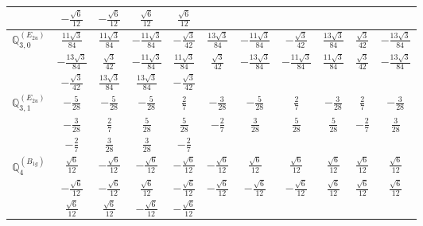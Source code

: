 \documentclass[fleqn,10pt,landscape]{article}
\begin{document}
\begin{itemize}
{\begin{center}
\begin{longtable}{ccccccccccc}
& $ - \frac{\sqrt{6}}{12} $ & $ - \frac{\sqrt{6}}{12} $ & $ \frac{\sqrt{6}}{12} $ & $ \frac{\sqrt{6}}{12} $ & $  $ & $  $ & $  $ & $  $ & $  $ & $  $ \\ \hline
$\mathbb{Q}_{3,0}^{(E_{2u})}$ & $ \frac{11 \sqrt{3}}{84} $ & $ \frac{11 \sqrt{3}}{84} $ & $ - \frac{11 \sqrt{3}}{84} $ & $ - \frac{\sqrt{3}}{42} $ & $ \frac{13 \sqrt{3}}{84} $ & $ - \frac{11 \sqrt{3}}{84} $ & $ - \frac{\sqrt{3}}{42} $ & $ \frac{13 \sqrt{3}}{84} $ & $ \frac{\sqrt{3}}{42} $ & $ - \frac{13 \sqrt{3}}{84} $ \\
& $ - \frac{13 \sqrt{3}}{84} $ & $ \frac{\sqrt{3}}{42} $ & $ - \frac{11 \sqrt{3}}{84} $ & $ \frac{11 \sqrt{3}}{84} $ & $ \frac{\sqrt{3}}{42} $ & $ - \frac{13 \sqrt{3}}{84} $ & $ - \frac{11 \sqrt{3}}{84} $ & $ \frac{11 \sqrt{3}}{84} $ & $ \frac{\sqrt{3}}{42} $ & $ - \frac{13 \sqrt{3}}{84} $ \\
& $ - \frac{\sqrt{3}}{42} $ & $ \frac{13 \sqrt{3}}{84} $ & $ \frac{13 \sqrt{3}}{84} $ & $ - \frac{\sqrt{3}}{42} $ & $  $ & $  $ & $  $ & $  $ & $  $ & $  $ \\ \hline
$\mathbb{Q}_{3,1}^{(E_{2u})}$ & $ - \frac{5}{28} $ & $ - \frac{5}{28} $ & $ - \frac{5}{28} $ & $ \frac{2}{7} $ & $ - \frac{3}{28} $ & $ - \frac{5}{28} $ & $ \frac{2}{7} $ & $ - \frac{3}{28} $ & $ \frac{2}{7} $ & $ - \frac{3}{28} $ \\
& $ - \frac{3}{28} $ & $ \frac{2}{7} $ & $ \frac{5}{28} $ & $ \frac{5}{28} $ & $ - \frac{2}{7} $ & $ \frac{3}{28} $ & $ \frac{5}{28} $ & $ \frac{5}{28} $ & $ - \frac{2}{7} $ & $ \frac{3}{28} $ \\
& $ - \frac{2}{7} $ & $ \frac{3}{28} $ & $ \frac{3}{28} $ & $ - \frac{2}{7} $ & $  $ & $  $ & $  $ & $  $ & $  $ & $  $ \\ \hline
$\mathbb{Q}_{4}^{(B_{1g})}$ & $ \frac{\sqrt{6}}{12} $ & $ - \frac{\sqrt{6}}{12} $ & $ - \frac{\sqrt{6}}{12} $ & $ - \frac{\sqrt{6}}{12} $ & $ - \frac{\sqrt{6}}{12} $ & $ \frac{\sqrt{6}}{12} $ & $ \frac{\sqrt{6}}{12} $ & $ \frac{\sqrt{6}}{12} $ & $ \frac{\sqrt{6}}{12} $ & $ \frac{\sqrt{6}}{12} $ \\
& $ - \frac{\sqrt{6}}{12} $ & $ - \frac{\sqrt{6}}{12} $ & $ \frac{\sqrt{6}}{12} $ & $ - \frac{\sqrt{6}}{12} $ & $ - \frac{\sqrt{6}}{12} $ & $ - \frac{\sqrt{6}}{12} $ & $ - \frac{\sqrt{6}}{12} $ & $ \frac{\sqrt{6}}{12} $ & $ \frac{\sqrt{6}}{12} $ & $ \frac{\sqrt{6}}{12} $ \\
& $ \frac{\sqrt{6}}{12} $ & $ \frac{\sqrt{6}}{12} $ & $ - \frac{\sqrt{6}}{12} $ & $ - \frac{\sqrt{6}}{12} $ & $  $ & $  $ & $  $ & $  $ & $  $ & $  $ \\ \hline

\end{longtable}
\end{center}}
\end{itemize}
\end{document}
